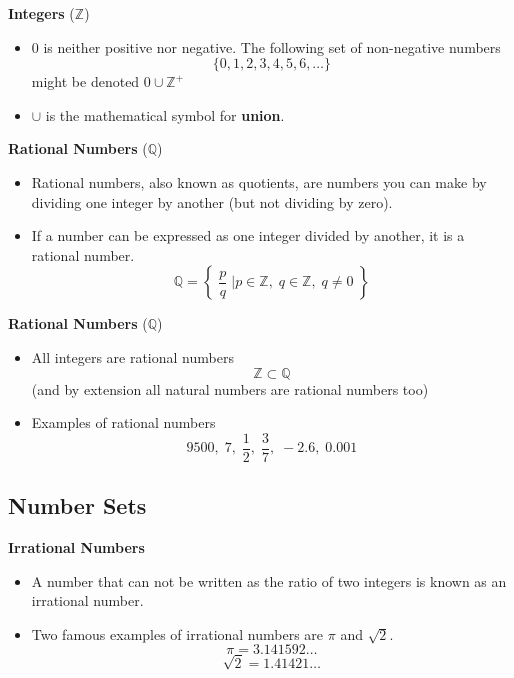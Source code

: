 \documentclass[11pt,a4paper,titlepage,oneside,openany]{article}
\numberwithin{equation}{section}
\numberwithin{algorithm}{section}
\numberwithin{figure}{section}
\numberwithin{table}{section}
\begin{document}
{%

\textbf{Integers} ($\mathbb{Z}$)
\begin{itemize}
\item 0 is neither positive nor negative. The following set of non-negative numbers \[\{0,1,2,3,4,5,6,\ldots\} \] might be denoted $0 \cup \mathbb{Z}^{+}$
\item $\cup$ is the mathematical symbol for \textbf{union}.
\end{itemize}



\textbf{Rational Numbers} ($\mathbb{Q}$)
\begin{itemize}
\item Rational numbers, also known as quotients, are numbers you can make by dividing one integer by another (but not dividing by zero). 
\item If a number can be expressed as one integer divided by another, it is a rational number.
\[ \mathbb{Q} = \left\{\; \frac{p}{q} \;\bigg| p \in \mathbb{Z},\; q \in \mathbb{Z},\; q \neq 0  \;   \right\}   \]
\end{itemize}



\textbf{Rational Numbers} ($\mathbb{Q}$)
\begin{itemize}
\item All integers are rational numbers 
\[ \mathbb{Z}  \subset \mathbb{Q}\]
(and by extension all natural numbers are rational numbers too)
\item Examples of rational numbers
\[ 9500,\;7,\; \frac{1}{2} ,\; \frac{3}{7},\; -2.6 ,\; 0.001\] 
\end{itemize}


\subsection{Number Sets}

\textbf{Irrational Numbers} 
\begin{itemize}
\item A number that can not be written as the ratio of two integers is known as an irrational number.
\item Two famous examples of irrational numbers are $\pi$ and $\sqrt{2}$. 
\[\pi = 3.141592\ldots\]
\[\sqrt{2} = 1.41421\ldots\]
\end{itemize}

}
\end{document}
